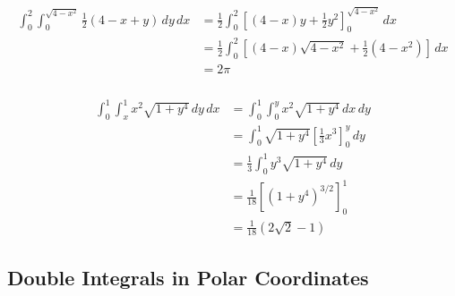 \documentclass{article}
\begin{document}
\begin{align*}
  \int_0^2 \int_0^{\sqrt{4 - x^2}} \frac{1}{2} (4 - x + y) \,dy \,dx & = \frac{1}{2} \int_0^2 \left[ (4 - x) y + \frac{1}{2} y^2 \right]_0^{\sqrt{4 - x^2}} \,dx \\
                                                                     & = \frac{1}{2} \int_0^2 \left[ (4 - x) \sqrt{4 - x^2} + \frac{1}{2} (4 - x^2) \right] \,dx \\
                                                                     & = 2 \pi
\end{align*}

\setcounter{subsubsection}{34}
\subsubsection{}

\begin{align*}
  \int_0^1 \int_x^1 x^2 \sqrt{1 + y^4} \,dy \,dx & = \int_0^1 \int_0^y x^2 \sqrt{1 + y^4} \,dx \,dy                  \\
                                                 & = \int_0^1 \sqrt{1 + y^4} \left[ \frac{1}{3} x^3 \right]_0^y \,dy \\
                                                 & = \frac{1}{3} \int_0^1 y^3 \sqrt{1 + y^4} \,dy                    \\
                                                 & = \frac{1}{18} [(1 + y^4)^{3 / 2}]_0^1                            \\
                                                 & = \frac{1}{18} (2 \sqrt{2} - 1)
\end{align*}

\subsection{Double Integrals in Polar Coordinates}

\subsubsection{}
\end{document}
